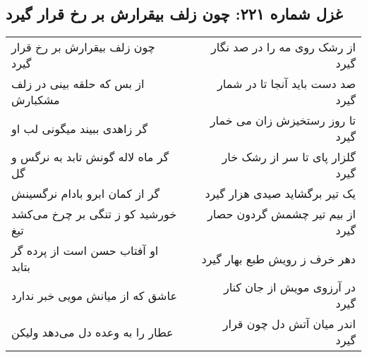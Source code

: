 \begin{center}
\section*{غزل شماره ۲۲۱: چون زلف بیقرارش بر رخ قرار گیرد}
\label{sec:221}
\begin{longtable}{l p{0.5cm} r}
چون زلف بیقرارش بر رخ قرار گیرد
&&
از رشک روی مه را در صد نگار گیرد
\\
از بس که حلقه بینی در زلف مشکبارش
&&
صد دست باید آنجا تا در شمار گیرد
\\
گر زاهدی ببیند میگونی لب او
&&
تا روز رستخیزش زان می خمار گیرد
\\
گر ماه لاله گونش تابد به نرگس و گل
&&
گلزار پای تا سر از رشک خار گیرد
\\
گر از کمان ابرو بادام نرگسینش
&&
یک تیر برگشاید صیدی هزار گیرد
\\
خورشید کو ز تنگی بر چرخ می‌کشد تیغ
&&
از بیم تیر چشمش گردون حصار گیرد
\\
او آفتاب حسن است از پرده گر بتابد
&&
دهر خرف ز رویش طبع بهار گیرد
\\
عاشق که از میانش مویی خبر ندارد
&&
در آرزوی مویش از جان کنار گیرد
\\
عطار را به وعده دل می‌دهد ولیکن
&&
اندر میان آتش دل چون قرار گیرد
\\
\end{longtable}
\end{center}

